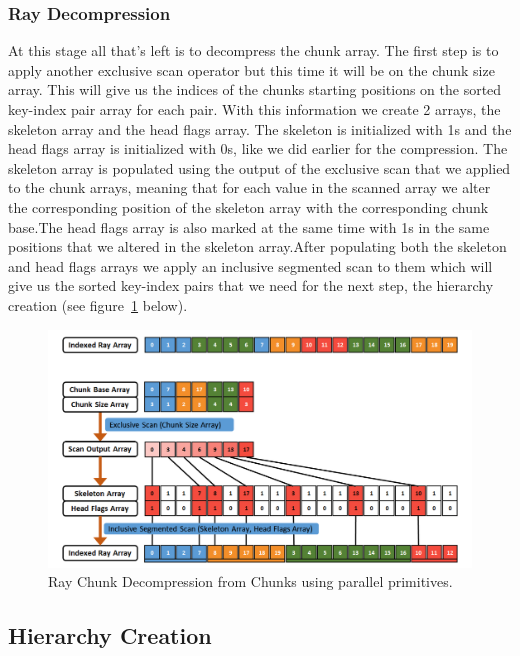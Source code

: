\documentclass{llncs}
\begin{document}
%
\subsubsection{Ray Decompression}
%

At this stage all that's left is to decompress the chunk array. The first step is to apply another exclusive scan operator but this time it will be on the chunk size array. This will give us the indices of the chunks starting positions on the sorted key-index pair array for each pair. With this information we create 2 arrays, the skeleton array and the head flags array. The skeleton is initialized with 1s and the head flags array is initialized with 0s, like we did earlier for the compression. The skeleton array is populated using the output of the exclusive scan that we applied to the chunk arrays, meaning that for each value in the scanned array we alter the corresponding position of the skeleton array with the corresponding chunk base.The head flags array is also marked at the same time with 1s in the same positions that we altered in the skeleton array.After populating both the skeleton and head flags arrays we apply an inclusive segmented scan to them which will give us the sorted key-index pairs that we need for the next step, the hierarchy creation (see figure~\ref{fig:ray-decompression} below).

\begin{figure}
\centering
\includegraphics[scale=0.45]{images/figure 11.png}
\caption{Ray Chunk Decompression from Chunks using parallel primitives.}
\label{fig:ray-decompression}
\end{figure}

\newpage

%
\subsection{Hierarchy Creation}
%
\end{document}
